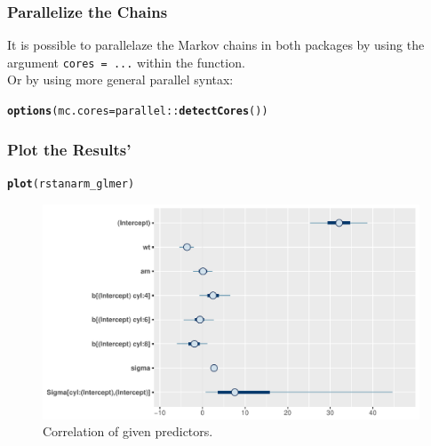 \documentclass[handout]{beamer}\usepackage[]{graphicx}\usepackage[]{color}
\makeatletter
\def\maxwidth{ %
  \ifdim\Gin@nat@width>\linewidth
    \linewidth
  \else
    \Gin@nat@width
  \fi
}
\newcommand{\hlopt}[1]{\textcolor[rgb]{0,0,0}{#1}}%
\newcommand{\hlstd}[1]{\textcolor[rgb]{0.345,0.345,0.345}{#1}}%
\newcommand{\hlkwc}[1]{\textcolor[rgb]{0.333,0.667,0.333}{#1}}%
\newcommand{\hlkwd}[1]{\textcolor[rgb]{0.737,0.353,0.396}{\textbf{#1}}}%
\newenvironment{kframe}{%
 \def\at@end@of@kframe{}%
 \ifinner\ifhmode%
  \def\at@end@of@kframe{\end{minipage}}%
  \begin{minipage}{\columnwidth}%
 \fi\fi%
 \def\FrameCommand##1{\hskip\@totalleftmargin \hskip-\fboxsep
 \colorbox{shadecolor}{##1}\hskip-\fboxsep
     \hskip-\linewidth \hskip-\@totalleftmargin \hskip\columnwidth}%
 \MakeFramed {\advance\hsize-\width
   \@totalleftmargin\z@ \linewidth\hsize
   \@setminipage}}%
 {\par\unskip\endMakeFramed%
 \at@end@of@kframe}
\newenvironment{knitrout}{}{} %
\makeatother
\begin{document}

\begin{frame}[fragile]
\frametitle{Parallelize the Chains}


It is possible to parallelaze the Markov chains in both packages by using the argument \texttt{cores = ...} within the function. \\
Or by using more general parallel syntax: \\
\begin{knitrout}
\color{fgcolor}\begin{kframe}
\begin{alltt}
\hlkwd{options} \hlstd{(}\hlkwc{mc.cores}\hlstd{=parallel}\hlopt{::}\hlkwd{detectCores} \hlstd{())}
\end{alltt}
\end{kframe}
\end{knitrout}

\end{frame}


\begin{frame}[fragile]
\frametitle{Plot the Results' }



\begin{knitrout}
\color{fgcolor}\begin{kframe}
\begin{alltt}
\hlkwd{plot}\hlstd{(rstanarm_glmer)}
\end{alltt}
\end{kframe}\begin{figure}[H]
\includegraphics[width=\maxwidth]{figure/p1b-1} \caption[Correlation of given predictors]{Correlation of given predictors.}\label{fig:p1b}
\end{figure}


\end{knitrout}

\end{frame}
\end{document}
